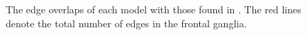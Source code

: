\begin{figure}[h]
  \centering
  
  \caption{The edge overlaps of each model with those found in \ce. The red lines denote the total number of edges in the \ce frontal ganglia.}
\end{figure}
